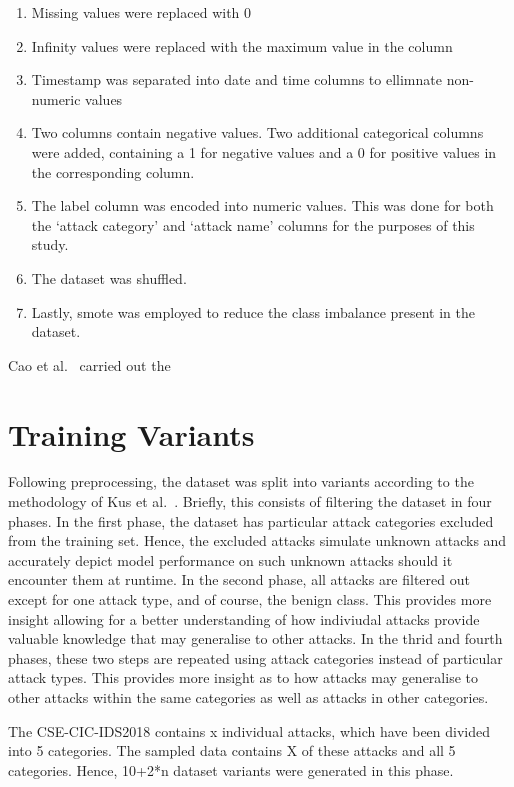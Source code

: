 \begin{enumerate}
    \item Missing values were replaced with 0
    \item Infinity values were replaced with the maximum value in the column
    \item Timestamp was separated into date and time columns to ellimnate
          non-numeric values
    \item Two columns contain negative values. Two additional categorical
          columns were added, containing a 1 for negative values and a 0 for
          positive values in the corresponding column.
    \item The label column was encoded into numeric values. This was done
          for both the `attack category' and `attack name' columns for the
          purposes of
          this study.
    \item The dataset was shuffled.
    \item Lastly, \gls{smote} was employed to reduce the class imbalance
          present in the dataset.
\end{enumerate}

Cao et al.~\cite{Cao} carried out the

\section{Training Variants}%
\label{sec:variants}

Following preprocessing, the dataset was split into variants according to the
methodology of Kus et al.~\cite{Kus}. Briefly, this consists of filtering the
dataset in four phases. In the first phase, the dataset has particular attack
categories excluded from the training set. Hence, the excluded attacks simulate
unknown attacks and accurately depict model performance on such unknown attacks
should it encounter them at runtime. In the second phase, all attacks are
filtered out except for one attack type, and of course, the benign class. This
provides more insight allowing for a better understanding of how indiviudal
attacks provide valuable knowledge that may generalise to other attacks. In the
thrid and fourth phases, these two steps are repeated using attack categories
instead of particular attack types. This provides more insight as to how
attacks may generalise to other attacks within the same categories as well as
attacks in other categories.

The CSE-CIC-IDS2018 contains x individual attacks,
which have been divided into 5 categories. The sampled data contains X of these
attacks and all 5 categories. Hence, 10+2*n dataset variants were generated in
this phase.

